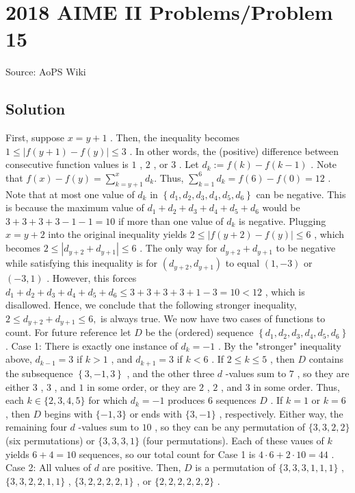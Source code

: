 \documentclass[12pt]{article}
\begin{document}
\section*{{2018 AIME II Problems/Problem 15}}
Source: AoPS Wiki

\subsection*{Solution}
First, suppose $x = y + 1$ . Then, the inequality becomes $1 \leq |f(y + 1) - f(y)| \leq 3$ . In other words, the (positive) difference between consecutive function values is $1$ , $2$ , or $3$ . Let $d_k := f(k) - f(k - 1)$ . Note that $f(x) - f(y) = \sum_{k=y+1}^{x} d_k.$ Thus, $\sum_{k=1}^{6} d_k = f(6) - f(0) = 12$ . Note that at most one value of $d_k$ in $\left\{d_1, d_2, d_3, d_4, d_5, d_6\right\}$ can be negative. This is because the maximum value of $d_1 + d_2 + d_3 + d_4 + d_5 + d_6$ would be $3 + 3 + 3 + 3 - 1 - 1 = 10$ if more than one value of $d_k$ is negative. Plugging $x = y + 2$ into the original inequality yields $2 \leq |f(y + 2) - f(y)| \leq 6$ , which becomes $2 \leq \left|d_{y+2} + d_{y+1}\right| \leq 6$ . The only way for $d_{y+2} + d_{y+1}$ to be negative while satisfying this inequality is for $\left(d_{y+2}, d_{y+1}\right)$ to equal $(1, -3)$ or $(-3, 1)$ . However, this forces $d_1 + d_2 + d_3 + d_4 + d_5 + d_6 \leq 3 + 3 + 3 + 3 + 1 - 3 = 10 < 12$ , which is disallowed. Hence, we conclude that the following stronger inequality, $2 \leq d_{y + 2} + d_{y + 1} \leq 6,$ is always true. We now have two cases of functions to count. For future reference let $D$ be the (ordered) sequence $\left\{d_1, d_2, d_3, d_4, d_5, d_6\right\}$ . Case 1: There is exactly one instance of $d_k = -1$ . By the "stronger" inequality above, $d_{k-1} = 3$ if $k > 1$ , and $d_{k+1} = 3$ if $k < 6$ . If $2 \leq k \leq 5$ , then $D$ contains the subsequence $\left\{3, -1, 3\right\}$ , and the other three $d$ -values sum to $7$ , so they are either $3$ , $3$ , and $1$ in some order, or they are $2$ , $2$ , and $3$ in some order. Thus, each $k \in \{2, 3, 4, 5\}$ for which $d_k = -1$ produces $6$ sequences $D$ . If $k = 1$ or $k = 6$ , then $D$ begins with $\{-1, 3\}$ or ends with $\{3, -1\}$ , respectively. Either way, the remaining four $d$ -values sum to $10$ , so they can be any permutation of $\{3, 3, 2, 2\}$ (six permutations) or $\{3, 3, 3, 1\}$ (four permutations). Each of these vaues of $k$ yields $6 + 4 = 10$ sequences, so our total count for Case 1 is $4 \cdot 6 + 2 \cdot 10 = 44$ . Case 2: All values of $d$ are positive. Then, $D$ is a permutation of $\{3, 3, 3, 1, 1, 1\}$ , $\{3, 3, 2, 2, 1, 1\}$ , $\{3, 2, 2, 2, 2, 1\}$ , or $\{2, 2, 2, 2, 2, 2\}$ .
\end{document}
